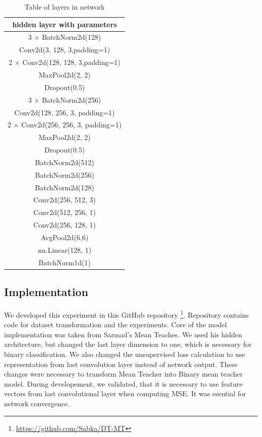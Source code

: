\begin{table}[ht]
    \centering
    \begin{tabular}{ |c|} 
     \hline
            hidden layer with parameters \\
            \hline
            3 $\times$ BatchNorm2d(128) \\
            Conv2d(3, 128, 3,padding=1) \\
            2 $\times$ Conv2d(128, 128, 3,padding=1) \\
            MaxPool2d(2, 2)\\
            Dropout(0.5)\\
            3 $\times$ BatchNorm2d(256)\\
            Conv2d(128, 256, 3, padding=1)\\
            2 $\times$ Conv2d(256, 256, 3, padding=1)\\
            MaxPool2d(2, 2)\\
            Dropout(0.5)\\
            BatchNorm2d(512)\\
            BatchNorm2d(256)\\
            BatchNorm2d(128)\\
            Conv2d(256, 512, 3)\\
            Conv2d(512, 256, 1)\\
            Conv2d(256, 128, 1)\\
            AvgPool2d(6,6)\\
            nn.Linear(128, 1)\\
            BatchNorm1d(1)\\
     \hline
    \end{tabular}
    \caption{Table of layers in network}
    \label{layers}
\end{table}

\subsection{Implementation}
We developed this experiment in this GitHub repository \footnote{\url{https://github.com/Sabka/DT-MT}}. Repository contains code for dataset transformation and the experiments.
Core of the model implementation was taken from Sarmad's Mean Teaches. We used his hidden architecture, but changed the last layer dimension to one, which is necessary for binary classification. We also changed the unsupervised loss calculation to use representation from last convolution layer instead of network output. These changes were necessary to transform Mean Teacher into Binary mean teacher model.
During developement, we validated, that it is necessary to use feature vectors from last convolutional layer when computing MSE. It was esential for network convergence. 

